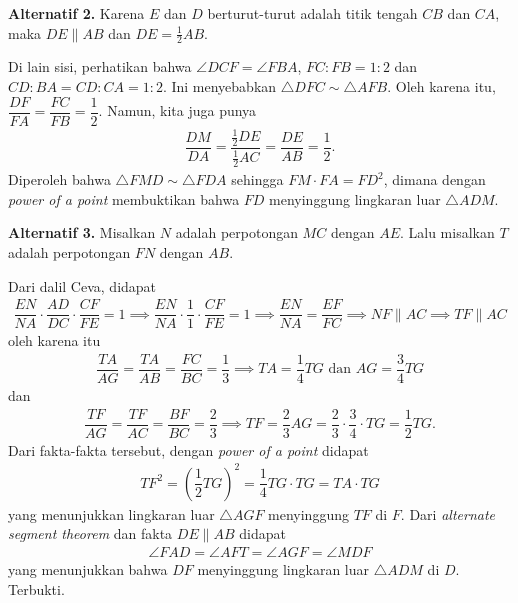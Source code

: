     \textbf{Alternatif 2.} Karena $E$ dan $D$ berturut-turut adalah  titik tengah $CB$ dan $CA$, maka $DE \parallel AB$ dan $DE= \frac{1}{2}AB$. 

    Di lain sisi, perhatikan bahwa $\angle DCF = \angle FBA$, $FC:FB=1:2$ dan $CD:BA= CD:CA = 1:2$. Ini menyebabkan $\triangle DFC \sim \triangle AFB$. Oleh karena itu, $\dfrac{DF}{FA} = \dfrac{FC}{FB} = \dfrac{1}{2}$. Namun, kita juga punya
    \begin{align*}
        \dfrac{DM}{DA} = \dfrac{\frac{1}{2}DE}{\frac{1}{2}{AC}} = \dfrac{DE}{AB} = \dfrac{1}{2}.
    \end{align*}
    Diperoleh bahwa $\triangle FMD \sim \triangle FDA$ sehingga $FM \cdot FA = FD^2$, dimana dengan \textit{power of a point} membuktikan bahwa $FD$ menyinggung lingkaran luar $\triangle ADM$.

    \textbf{Alternatif 3.} Misalkan $N$ adalah perpotongan $MC$ dengan $AE$. Lalu misalkan $T$ adalah perpotongan $FN$ dengan $AB$. 

    Dari dalil Ceva, didapat
    \begin{align*}
        \dfrac{EN}{NA} \cdot \dfrac{AD}{DC} \cdot \dfrac{CF}{FE} = 1 \implies \dfrac{EN}{NA} \cdot \dfrac{1}{1} \cdot \dfrac{CF}{FE} = 1 \implies \dfrac{EN}{NA} = \dfrac{EF}{FC} \implies NF \parallel AC \implies TF \parallel AC
    \end{align*}
    oleh karena itu
    \begin{align*}
        \dfrac{TA}{AG}=\dfrac{TA}{AB} = \dfrac{FC}{BC} = \dfrac{1}{3} \implies TA = \dfrac{1}{4} TG \text{ dan } AG = \dfrac{3}{4}TG
    \end{align*}
    dan
    \begin{align*}
        \dfrac{TF}{AG}=\dfrac{TF}{AC} = \dfrac{BF}{BC} = \dfrac{2}{3} \implies TF= \dfrac{2}{3}AG = \dfrac{2}{3} \cdot \dfrac{3}{4} \cdot TG = \dfrac{1}{2} TG.
    \end{align*}
    Dari fakta-fakta tersebut, dengan \textit{power of a point} didapat
    \begin{align*}
        TF^2 = \left(\dfrac{1}{2} TG\right)^2 = \dfrac{1}{4}TG \cdot TG = TA \cdot TG
    \end{align*}
    yang menunjukkan lingkaran luar $\triangle AGF$ menyinggung $TF$ di $F$. Dari \textit{alternate segment theorem} dan fakta $DE \parallel AB$ didapat 
    \begin{align*}
        \angle FAD = \angle AFT = \angle AGF = \angle MDF
    \end{align*}
    yang menunjukkan bahwa $DF$ menyinggung lingkaran luar $\triangle ADM$ di $D$. Terbukti.
